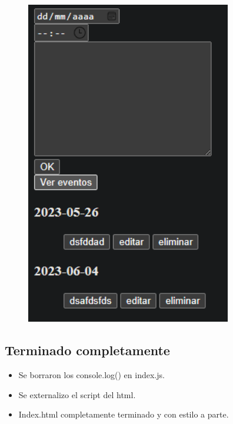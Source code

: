 \documentclass{article}
\begin{document}
	\begin{figure}[H]
		\centering
		\includegraphics[width=0.8\textwidth,keepaspectratio]{img/ver-eventos01.png}
	\end{figure}
	\subsection{Terminado completamente}
	\begin{itemize}	
		\item Se borraron los console.log() en index.js.
		\item Se externalizo el script del html.
		\item Index.html completamente terminado y con estilo a parte.
	\end{itemize}
	
	
	
	
\end{document}
